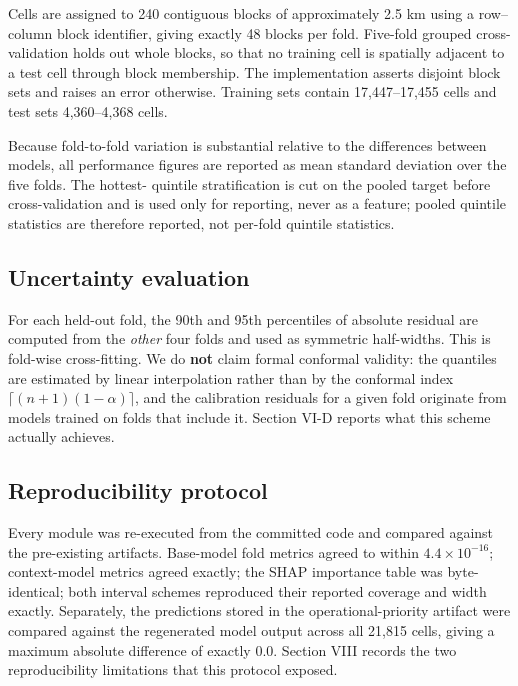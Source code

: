 \documentclass[conference]{IEEEtran}
\begin{document}
Cells are assigned to 240 contiguous blocks of approximately 2.5 km using a row--column block
identifier, giving exactly 48 blocks per fold. Five-fold grouped cross-validation holds out whole
blocks, so that no training cell is spatially adjacent to a test cell through block membership. The
implementation asserts disjoint block sets and raises an error otherwise. Training sets contain
17,447--17,455 cells and test sets 4,360--4,368 cells.

Because fold-to-fold variation is substantial relative to the differences between models, all
performance figures are reported as mean \textpm{} standard deviation over the five folds. The hottest-
quintile stratification is cut on the pooled target before cross-validation and is used only for
reporting, never as a feature; pooled quintile statistics are therefore reported, not per-fold
quintile statistics.

\subsection{Uncertainty evaluation}\label{c.-uncertainty-evaluation}

For each held-out fold, the 90th and 95th percentiles of absolute residual are computed from the
\emph{other} four folds and used as symmetric half-widths. This is fold-wise cross-fitting. We do \textbf{not}
claim formal conformal validity: the quantiles are estimated by linear interpolation rather than by
the conformal index \(\lceil (n+1)(1 - \alpha) \rceil\), and the calibration residuals for a given fold
originate from models trained on folds that include it. Section VI-D reports what this scheme
actually achieves.

\subsection{Reproducibility protocol}\label{d.-reproducibility-protocol}

Every module was re-executed from the committed code and compared against the pre-existing
artifacts. Base-model fold metrics agreed to within \(4.4 \times 10^{-16}\); context-model metrics
agreed exactly; the SHAP importance table was byte-identical; both interval schemes reproduced their
reported coverage and width exactly. Separately, the predictions stored in the operational-priority
artifact were compared against the regenerated model output across all 21,815 cells, giving a
maximum absolute difference of exactly 0.0. Section VIII records the two reproducibility
limitations that this protocol exposed.
\end{document}
